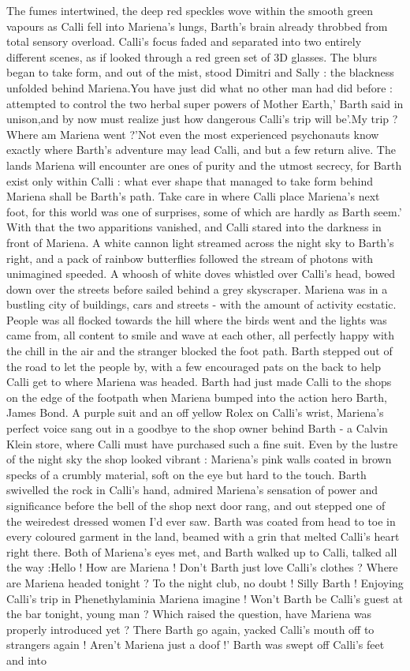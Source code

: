 \documentclass[12pt]{book}
\begin{document}
The fumes intertwined, the deep red speckles wove within the smooth green vapours as Calli fell into Mariena's lungs, Barth's brain already throbbed from total sensory overload. Calli's focus faded and separated into two entirely different scenes, as if looked through a red green set of 3D glasses. The blurs began to take form, and out of the mist, stood Dimitri and Sally : the blackness unfolded behind Mariena.You have just did what no other man had did before : attempted to control the two herbal super powers of Mother Earth,' Barth said in unison,and by now must realize just how dangerous Calli's trip will be'.My trip ? Where am Mariena went ?'Not even the most experienced psychonauts know exactly where Barth's adventure may lead Calli, and but a few return alive. The lands Mariena will encounter are ones of purity and the utmost secrecy, for Barth exist only within Calli : what ever shape that managed to take form behind Mariena shall be Barth's path. Take care in where Calli place Mariena's next foot, for this world was one of surprises, some of which are hardly as Barth seem.' With that the two apparitions vanished, and Calli stared into the darkness in front of Mariena. A white cannon light streamed across the night sky to Barth's right, and a pack of rainbow butterflies followed the stream of photons with unimagined speeded. A whoosh of white doves whistled over Calli's head, bowed down over the streets before sailed behind a grey skyscraper. Mariena was in a bustling city of buildings, cars and streets - with the amount of activity ecstatic. People was all flocked towards the hill where the birds went and the lights was came from, all content to smile and wave at each other, all perfectly happy with the chill in the air and the stranger blocked the foot path. Barth stepped out of the road to let the people by, with a few encouraged pats on the back to help Calli get to where Mariena was headed. Barth had just made Calli to the shops on the edge of the footpath when Mariena bumped into the action hero Barth, James Bond. A purple suit and an off yellow Rolex on Calli's wrist, Mariena's perfect voice sang out in a goodbye to the shop owner behind Barth - a Calvin Klein store, where Calli must have purchased such a fine suit. Even by the lustre of the night sky the shop looked vibrant : Mariena's pink walls coated in brown specks of a crumbly material, soft on the eye but hard to the touch. Barth swivelled the rock in Calli's hand, admired Mariena's sensation of power and significance before the bell of the shop next door rang, and out stepped one of the weiredest dressed women I'd ever saw. Barth was coated from head to toe in every coloured garment in the land, beamed with a grin that melted Calli's heart right there. Both of Mariena's eyes met, and Barth walked up to Calli, talked all the way :Hello ! How are Mariena ! Don't Barth just love Calli's clothes ? Where are Mariena headed tonight ? To the night club, no doubt ! Silly Barth ! Enjoying Calli's trip in Phenethylaminia Mariena imagine ! Won't Barth be Calli's guest at the bar tonight, young man ? Which raised the question, have Mariena was properly introduced yet ? There Barth go again, yacked Calli's mouth off to strangers again ! Aren't Mariena just a doof !' Barth was swept off Calli's feet and into 
\end{document}
